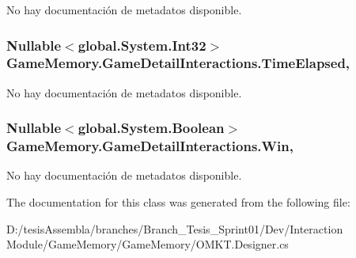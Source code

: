 No hay documentación de metadatos disponible. 

\hypertarget{class_game_memory_1_1_game_detail_interactions_a98537a11e123106e4197c9e163fcaa8c}{
\subsubsection[{Time\-Elapsed}]{\setlength{\rightskip}{0pt plus 5cm}Nullable$<$global.\-System.\-Int32$>$ Game\-Memory.\-Game\-Detail\-Interactions.\-Time\-Elapsed\hspace{0.3cm}{\ttfamily [get]}, {\ttfamily [set]}}}\label{class_game_memory_1_1_game_detail_interactions_a98537a11e123106e4197c9e163fcaa8c}


No hay documentación de metadatos disponible. 

\hypertarget{class_game_memory_1_1_game_detail_interactions_aa3afd285fef25ceaf38fe36e2bfb0f6b}{
\subsubsection[{Win}]{\setlength{\rightskip}{0pt plus 5cm}Nullable$<$global.\-System.\-Boolean$>$ Game\-Memory.\-Game\-Detail\-Interactions.\-Win\hspace{0.3cm}{\ttfamily [get]}, {\ttfamily [set]}}}\label{class_game_memory_1_1_game_detail_interactions_aa3afd285fef25ceaf38fe36e2bfb0f6b}


No hay documentación de metadatos disponible. 



The documentation for this class was generated from the following file\-:\begin{DoxyCompactItemize}
\item 
D\-:/tesis\-Assembla/branches/\-Branch\-\_\-\-Tesis\-\_\-\-Sprint01/\-Dev/\-Interaction Module/\-Game\-Memory/\-Game\-Memory/O\-M\-K\-T.\-Designer.\-cs\end{DoxyCompactItemize}
